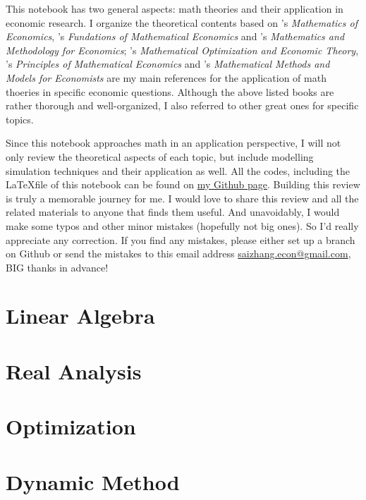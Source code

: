 \documentclass[12pt,openany]{report}
\begin{document}
This notebook has two general aspects: math theories and their application in economic research. I organize
the theoretical contents based on \citet{hoy2011mathematics}'s \textit{Mathematics of Economics}, 
\citet{carter2001foundations}'s \textit{Fundations of Mathematical Economics} and \citet{eichhornmathematics}'s 
\textit{Mathematics and Methodology for Economics}; \citet{intriligator2002mathematical}'s \textit{Mathematical Optimization and Economic Theory},
 \citet{vali2014principles}'s \textit{Principles of Mathematical Economics}
and \citet{de2000mathematical}'s \textit{Mathematical Methods and Models for Economists} are my main references
for the application of math thoeries in specific economic questions. Although the above listed books are
rather thorough and well-organized, I also referred to other great ones for specific topics.

Since this notebook approaches math in an application perspective, I will not only
review the theoretical aspects of each topic, but include modelling simulation techniques
and their application as well. All the codes, including the \LaTeX file of this notebook
can be found on \href{https://github.com/SaiChrisZHANG}{my Github page}. 
Building this review is truly a memorable journey for me. I would love to share this review and all the related
materials to anyone that finds them useful. And unavoidably, I would make some
typos and other minor mistakes (hopefully not big ones). So I'd really appreciate
any correction. If you find any mistakes, please either set up a branch on Github
or send the mistakes to this email address \href{mailto:saizhang.econ@gmail.com}{saizhang.econ@gmail.com}, BIG thanks in advance!

\newpage

\dominitoc
{}
\label{ToC-first-page}
\tableofcontents

\pagestyle{mystyle}
\chapter{Linear Algebra}


\chapter{Real Analysis}

\chapter{Optimization}

\chapter{Dynamic Method}

\newpage


\end{document}
